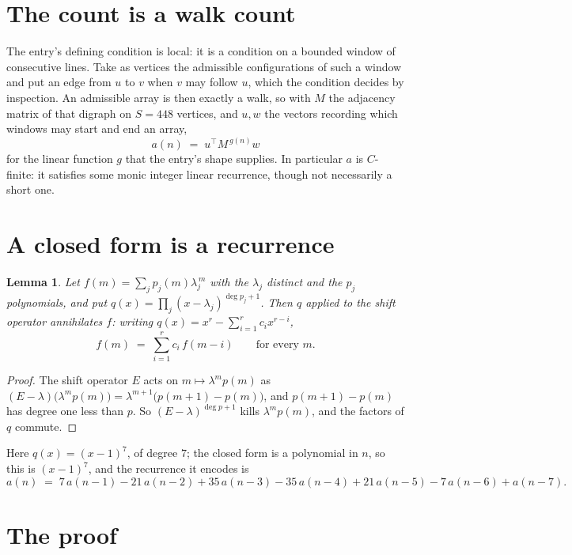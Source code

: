\documentclass[11pt,a4paper]{article}
\theoremstyle{plain}
\newtheorem{lemma}[theorem]{Lemma}
\theoremstyle{definition}
\begin{document}
\section{The count is a walk count}

The entry's defining condition is local: it is a condition on a bounded window of consecutive lines. Take as vertices the
admissible configurations of such a window and put an edge from $u$ to $v$ when $v$ may
follow $u$, which the condition decides by inspection. An admissible array is then exactly a
walk, so with $M$ the adjacency matrix of that digraph on $S=448$ vertices, and $u,w$ the
vectors recording which windows may start and end an array,
\[
a(n)\;=\;u^{\!\top}M^{\,g(n)}w
\]
for the linear function $g$ that the entry's shape supplies. In particular $a$ is
$C$-finite: it satisfies some monic integer linear recurrence, though not necessarily a short
one.

\section{A closed form is a recurrence}

\begin{lemma}\label{lem:ann}
Let $f(m)=\sum_{j}p_j(m)\lambda_j^{\,m}$ with the $\lambda_j$ distinct and the $p_j$
polynomials, and put $q(x)=\prod_j(x-\lambda_j)^{\deg p_j+1}$. Then $q$ applied to the shift
operator annihilates $f$: writing $q(x)=x^{r}-\sum_{i=1}^{r}c_ix^{r-i}$,
\[
f(m)\;=\;\sum_{i=1}^{r}c_i\,f(m-i)\qquad\text{for every }m.
\]
\end{lemma}

\begin{proof}
The shift operator $E$ acts on $m\mapsto\lambda^{m}p(m)$ as
$(E-\lambda)\bigl(\lambda^{m}p(m)\bigr)=\lambda^{m+1}\bigl(p(m+1)-p(m)\bigr)$, and
$p(m+1)-p(m)$ has degree one less than $p$. So $(E-\lambda)^{\deg p+1}$ kills
$\lambda^{m}p(m)$, and the factors of $q$ commute.
\end{proof}

Here $q(x)=(x-1)^{7}$, of degree $7$; the closed form is a polynomial in $n$, so this is $(x-1)^{7}$, and the recurrence it encodes is
\begin{equation}\label{eq:rec}
a(n)\;=\;7\,a(n-1) - 21\,a(n-2) + 35\,a(n-3) - 35\,a(n-4) + 21\,a(n-5) - 7\,a(n-6) + a(n-7).
\end{equation}

\section{The proof}
\end{document}
